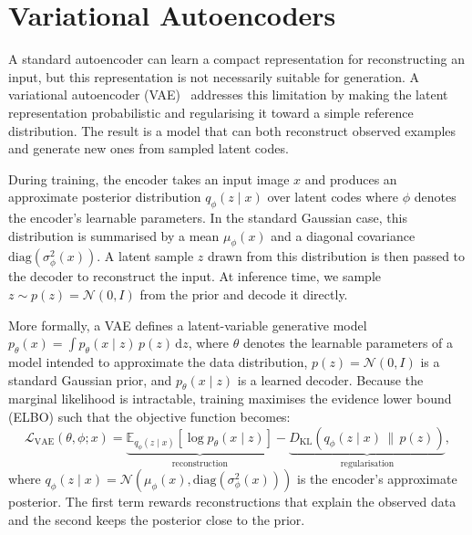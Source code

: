 
\section{Variational Autoencoders}
\label{sec:vae_disentanglement}

A standard autoencoder can learn a compact representation for reconstructing an input, but this representation is not necessarily suitable for generation.
A variational autoencoder (VAE)~\citep{kingma2013auto} addresses this limitation by making the latent
representation probabilistic and regularising it toward a simple reference distribution.
The result is a model that can both reconstruct observed examples and generate new ones
from sampled latent codes.

During training, the encoder takes an input image $x$ and produces an approximate
posterior distribution $q_\phi(z \mid x)$ over latent codes where $\phi$ denotes the
encoder's learnable parameters. In the standard Gaussian case, this distribution is
summarised by a mean $\mu_\phi(x)$ and a diagonal covariance
$\mathrm{diag}(\sigma_\phi^2(x))$. A latent sample $z$ drawn from this distribution is
then passed to the decoder to reconstruct the input. At inference time, we sample $z \sim p(z) = \mathcal{N}(0, I)$ from the prior and decode
it directly. 

More formally, a VAE defines a latent-variable generative model
$p_\theta(x) = \int p_\theta(x \mid z)\,p(z)\,\mathrm{d}z$, where $\theta$ denotes the
learnable parameters of a model intended to approximate the data distribution,
$p(z) = \mathcal{N}(0, I)$ is a standard Gaussian prior, and $p_\theta(x \mid z)$ is a
learned decoder. 
Because the
marginal likelihood is intractable, training maximises the evidence lower bound (ELBO) such that the objective function becomes:
\begin{equation}
    \mathcal{L}_{\mathrm{VAE}}(\theta, \phi; x)
    = \underbrace{\mathbb{E}_{q_\phi(z \mid x)}\!\left[\log p_\theta(x \mid z)\right]}_{\text{reconstruction}}
    -\underbrace{D_{\mathrm{KL}}\!\left(q_\phi(z \mid x)\,\|\,p(z)\right)}_{\text{regularisation}},
    \label{eq:elbo}
\end{equation}
where $q_\phi(z \mid x) = \mathcal{N}(\mu_\phi(x), \mathrm{diag}(\sigma^2_\phi(x)))$ is the
encoder's approximate posterior. The first term rewards reconstructions that explain the
observed data and the second keeps the posterior close to the prior.

